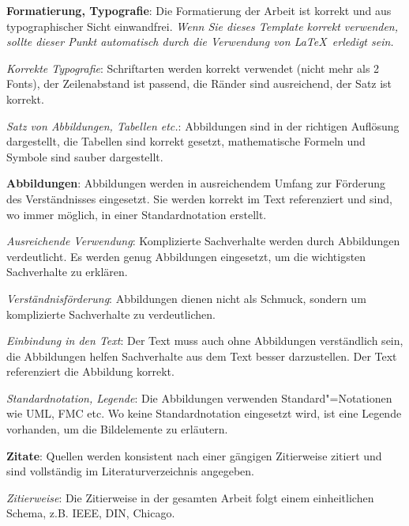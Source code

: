 \begin{checklist}
\begin{checklist}
    \end{checklist}
  \item \textbf{Formatierung, Typografie}: Die Formatierung der Arbeit ist korrekt und aus typographischer Sicht einwandfrei. \textit{Wenn Sie dieses Template korrekt verwenden, sollte dieser Punkt automatisch durch die Verwendung von \LaTeX \ erledigt sein.}
    \begin{checklist}
        \item \textit{Korrekte Typografie}: Schriftarten werden korrekt verwendet (nicht mehr als 2 Fonts), der Zeilenabstand ist passend, die Ränder sind ausreichend, der Satz ist korrekt.
        \item \textit{Satz von Abbildungen, Tabellen etc.}: Abbildungen sind in der richtigen Auflösung dargestellt, die Tabellen sind korrekt gesetzt, mathematische Formeln und Symbole sind sauber dargestellt.
    \end{checklist}
  \item \textbf{Abbildungen}: Abbildungen werden in ausreichendem Umfang zur Förderung des Verständnisses eingesetzt. Sie werden korrekt im Text referenziert und sind, wo immer möglich, in einer Standardnotation erstellt.
    \begin{checklist}
        \item \textit{Ausreichende Verwendung}: Komplizierte Sachverhalte werden durch Abbildungen verdeutlicht. Es werden genug Abbildungen eingesetzt, um die wichtigsten Sachverhalte zu erklären.
        \item \textit{Verständnisförderung}: Abbildungen dienen nicht als Schmuck, sondern um komplizierte Sachverhalte zu verdeutlichen.
        \item \textit{Einbindung in den Text}: Der Text muss auch ohne Abbildungen verständlich sein, die Abbildungen helfen Sachverhalte aus dem Text besser darzustellen. Der Text referenziert die Abbildung korrekt.
        \item \textit{Standardnotation, Legende}: Die Abbildungen verwenden Standard"=Notationen wie UML, FMC etc. Wo keine Standardnotation eingesetzt wird, ist eine Legende vorhanden, um die Bildelemente zu erläutern.
    \end{checklist}
  \item \textbf{Zitate}: Quellen werden konsistent nach einer gängigen Zitierweise zitiert und sind vollständig im Literaturverzeichnis angegeben.
    \begin{checklist}
        \item \textit{Zitierweise}: Die Zitierweise in der gesamten Arbeit folgt einem einheitlichen Schema, z.B. IEEE, DIN, Chicago.

\end{checklist}
\end{checklist}
